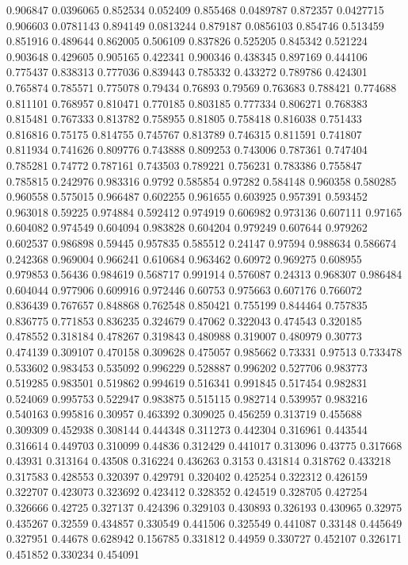 0.906847 0.0396065
0.852534 0.052409
0.855468 0.0489787
0.872357 0.0427715
0.906603 0.0781143
0.894149 0.0813244
0.879187 0.0856103
0.854746 0.513459
0.851916 0.489644
0.862005 0.506109
0.837826 0.525205
0.845342 0.521224
0.903648 0.429605
0.905165 0.422341
0.900346 0.438345
0.897169 0.444106
0.775437 0.838313
0.777036 0.839443
0.785332 0.433272
0.789786 0.424301
0.765874 0.785571
0.775078 0.79434
0.76893 0.79569
0.763683 0.788421
0.774688 0.811101
0.768957 0.810471
0.770185 0.803185
0.777334 0.806271
0.768383 0.815481
0.767333 0.813782
0.758955 0.81805
0.758418 0.816038
0.751433 0.816816
0.75175 0.814755
0.745767 0.813789
0.746315 0.811591
0.741807 0.811934
0.741626 0.809776
0.743888 0.809253
0.743006 0.787361
0.747404 0.785281
0.74772 0.787161
0.743503 0.789221
0.756231 0.783386
0.755847 0.785815
0.242976 0.983316
0.9792 0.585854
0.97282 0.584148
0.960358 0.580285
0.960558 0.575015
0.966487 0.602255
0.961655 0.603925
0.957391 0.593452
0.963018 0.59225
0.974884 0.592412
0.974919 0.606982
0.973136 0.607111
0.97165 0.604082
0.974549 0.604094
0.983828 0.604204
0.979249 0.607644
0.979262 0.602537
0.986898 0.59445
0.957835 0.585512
0.24147 0.97594
0.988634 0.586674
0.242368 0.969004
0.966241 0.610684
0.963462 0.60972
0.969275 0.608955
0.979853 0.56436
0.984619 0.568717
0.991914 0.576087
0.24313 0.968307
0.986484 0.604044
0.977906 0.609916
0.972446 0.60753
0.975663 0.607176
0.766072 0.836439
0.767657 0.848868
0.762548 0.850421
0.755199 0.844464
0.757835 0.836775
0.771853 0.836235
0.324679 0.47062
0.322043 0.474543
0.320185 0.478552
0.318184 0.478267
0.319843 0.480988
0.319007 0.480979
0.30773 0.474139
0.309107 0.470158
0.309628 0.475057
0.985662 0.73331
0.97513 0.733478
0.533602 0.983453
0.535092 0.996229
0.528887 0.996202
0.527706 0.983773
0.519285 0.983501
0.519862 0.994619
0.516341 0.991845
0.517454 0.982831
0.524069 0.995753
0.522947 0.983875
0.515115 0.982714
0.539957 0.983216
0.540163 0.995816
0.30957 0.463392
0.309025 0.456259
0.313719 0.455688
0.309309 0.452938
0.308144 0.444348
0.311273 0.442304
0.316961 0.443544
0.316614 0.449703
0.310099 0.44836
0.312429 0.441017
0.313096 0.43775
0.317668 0.43931
0.313164 0.43508
0.316224 0.436263
0.3153 0.431814
0.318762 0.433218
0.317583 0.428553
0.320397 0.429791
0.320402 0.425254
0.322312 0.426159
0.322707 0.423073
0.323692 0.423412
0.328352 0.424519
0.328705 0.427254
0.326666 0.42725
0.327137 0.424396
0.329103 0.430893
0.326193 0.430965
0.32975 0.435267
0.32559 0.434857
0.330549 0.441506
0.325549 0.441087
0.33148 0.445649
0.327951 0.44678
0.628942 0.156785
0.331812 0.44959
0.330727 0.452107
0.326171 0.451852
0.330234 0.454091
